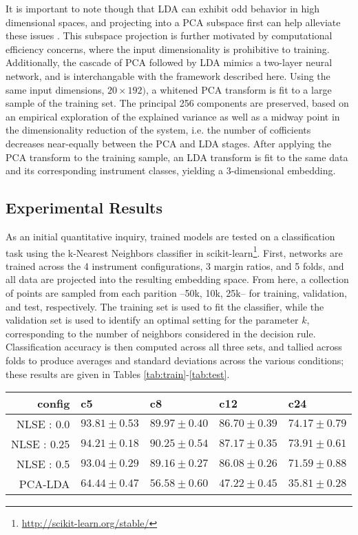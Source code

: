 It is important to note though that LDA can exhibit odd behavior in high dimensional spaces, and projecting into a PCA subspace first can help alleviate these issues \cite{PCASubspace?}.
This subspace projection is further motivated by computational efficiency concerns, where the input dimensionality is prohibitive to training.
Additionally, the cascade of PCA followed by LDA mimics a two-layer neural network, and is interchangable with the framework described here.
Using the same input dimensions, $20\times192)$, a whitened PCA transform is fit to a large sample of the training set.
The principal 256 components are preserved, based on an empirical exploration of the explained variance as well as a midway point in the dimensionality reduction of the system, i.e. the number of cofficients decreases near-equally between the PCA and LDA stages.
After applying the PCA transform to the training sample, an LDA transform is fit to the same data and its corresponding instrument classes, yielding a 3-dimensional embedding.


\subsection{Experimental Results}

As an initial quantitative inquiry, trained models are tested on a classification task using the k-Nearest Neighbors classifier in scikit-learn\footnote{\url{http://scikit-learn.org/stable/}}.
First, networks are trained across the 4 instrument configurations, 3 margin ratios, and 5 folds, and all data are projected into the resulting embedding space.
From here, a collection of points are sampled from each parition --50k, 10k, 25k-- for training, validation, and test, respectively.
The training set is used to fit the classifier, while the validation set is used to identify an optimal setting for the parameter $k$, corresponding to the number of neighbors considered in the decision rule.
Classification accuracy is then computed across all three sets, and tallied across folds to produce averages and standard deviations across the various conditions; these results are given in Tables \ref{tab:train}-\ref{tab:test}.


\begin{table*}[h]
\begin{center}
\caption{k-Neighbors classification results over the training set.}
\small
\begin{tabular}{rllll}
 config  & c5    & c8   & c12  & c24  \\
\hline
 NLSE : 0.0  & $93.81\pm0.53$ & $89.97\pm0.40$ & $86.70\pm0.39$ & $74.17\pm0.79$ \\
 NLSE : 0.25 & $94.21\pm0.18$ & $90.25\pm0.54$ & $87.17\pm0.35$ & $73.91\pm0.61$ \\
 NLSE : 0.5  & $93.04\pm0.29$ & $89.16\pm0.27$ & $86.08\pm0.26$ & $71.59\pm0.88$ \\
 \hline
 PCA-LDA & $64.44\pm0.47$ & $56.58\pm0.60$ & $47.22\pm0.45$ & $35.81\pm0.28$ \\

\hline
\end{tabular}
\label{tab:train}
\end{center}
\end{table*}

